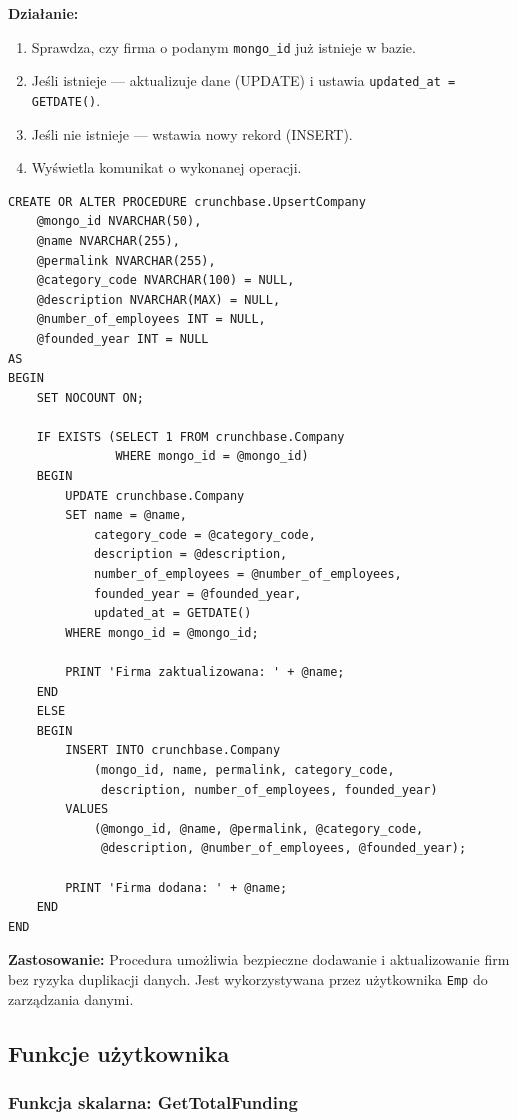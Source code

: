 \documentclass[12pt,a4paper]{article}
\begin{document}
\textbf{Działanie:}
\begin{enumerate}[noitemsep]
    \item Sprawdza, czy firma o podanym \texttt{mongo\_id} już istnieje w bazie.
    \item Jeśli istnieje --- aktualizuje dane (UPDATE) i ustawia \texttt{updated\_at = GETDATE()}.
    \item Jeśli nie istnieje --- wstawia nowy rekord (INSERT).
    \item Wyświetla komunikat o wykonanej operacji.
\end{enumerate}

\begin{lstlisting}[caption={Procedura UpsertCompany}]
CREATE OR ALTER PROCEDURE crunchbase.UpsertCompany
    @mongo_id NVARCHAR(50),
    @name NVARCHAR(255),
    @permalink NVARCHAR(255),
    @category_code NVARCHAR(100) = NULL,
    @description NVARCHAR(MAX) = NULL,
    @number_of_employees INT = NULL,
    @founded_year INT = NULL
AS
BEGIN
    SET NOCOUNT ON;

    IF EXISTS (SELECT 1 FROM crunchbase.Company
               WHERE mongo_id = @mongo_id)
    BEGIN
        UPDATE crunchbase.Company
        SET name = @name,
            category_code = @category_code,
            description = @description,
            number_of_employees = @number_of_employees,
            founded_year = @founded_year,
            updated_at = GETDATE()
        WHERE mongo_id = @mongo_id;

        PRINT 'Firma zaktualizowana: ' + @name;
    END
    ELSE
    BEGIN
        INSERT INTO crunchbase.Company
            (mongo_id, name, permalink, category_code,
             description, number_of_employees, founded_year)
        VALUES
            (@mongo_id, @name, @permalink, @category_code,
             @description, @number_of_employees, @founded_year);

        PRINT 'Firma dodana: ' + @name;
    END
END
\end{lstlisting}

\textbf{Zastosowanie:} Procedura umożliwia bezpieczne dodawanie i aktualizowanie firm bez ryzyka duplikacji danych. Jest wykorzystywana przez użytkownika \texttt{Emp} do zarządzania danymi.

\subsection{Funkcje użytkownika}

\subsubsection{Funkcja skalarna: GetTotalFunding}
\end{document}
